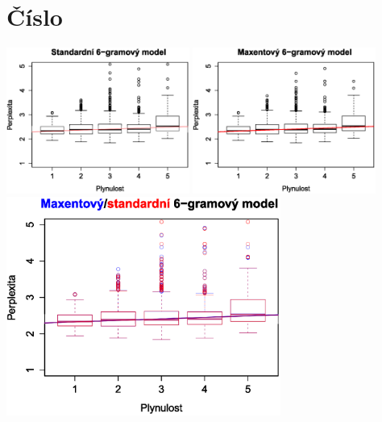 \documentclass[12pt,a4paper]{report}
\begin{document}
\section{Číslo}
\begin{center}
	\includegraphics[width=60mm]{./grafy/morf/ngram/cislo.svg.eps}
	\includegraphics[width=60mm]{./grafy/morf/maxent/cislo.svg.eps}	
	\includegraphics[width=90mm]{./grafy/morf/porovnani/cislo.svg.eps}
\end{center}
\end{document}

